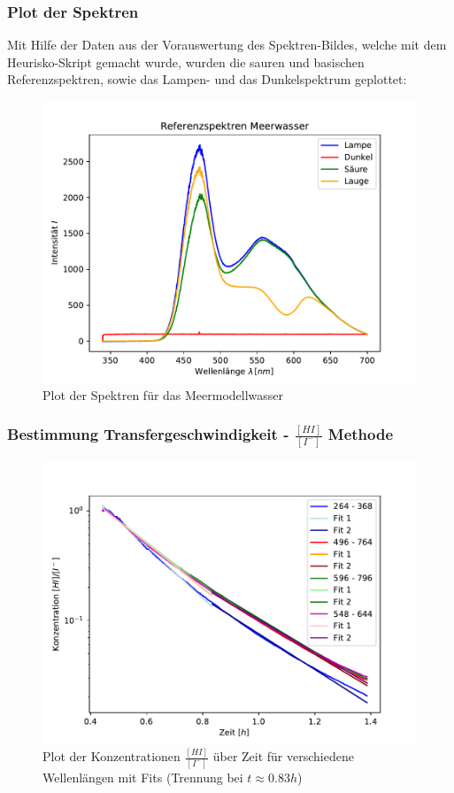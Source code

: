 \documentclass[12pt]{article}
\begin{document}
\subsubsection{Plot der Spektren}

Mit Hilfe der Daten aus der Vorauswertung des Spektren-Bildes, welche mit dem Heurisko-Skript gemacht wurde, wurden die sauren und basischen Referenzspektren, sowie das Lampen- und das Dunkelspektrum geplottet:

\begin{figure}[H]
	\centering
	\includegraphics[width=120mm]{Meerwasser/Referenzspektren}
	\caption{Plot der Spektren für das Meermodellwasser}
\end{figure}

\subsubsection{Bestimmung Transfergeschwindigkeit - $\frac{[HI]}{[I^-]}$ Methode}
\begin{figure}[H]
	\centering
	\includegraphics[width=120mm]{Meerwasser/TransferhIKnick}
	\caption{Plot der Konzentrationen $\frac{[HI]}{[I^-]}$ über Zeit für verschiedene Wellenlängen mit Fits (Trennung bei $t \approx 0.83h$)}
\end{figure}
\end{document}
